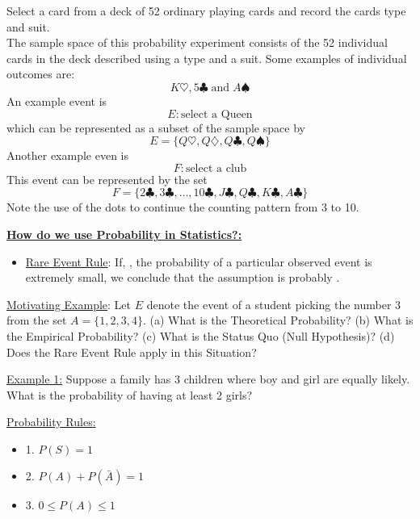 \documentclass[handout]{ximera}
\newcommand {\bi} {\begin{itemize}}
\newcommand {\ei} {\end{itemize}}
\begin{document}
	\begin{example}
	Select a card from a deck of 52 ordinary playing cards and record the cards type and suit.\\
	The sample space of this probability experiment consists of the 52 individual cards in the deck described using a type and a suit.  Some examples of individual outcomes are:
	\[
	K\heartsuit, 5 \clubsuit \; \mbox {and} \; A\spadesuit
	\]
	An example event is
	\[
	E: \mbox{select a Queen}
	\]
	which can be represented as a subset of the sample space by
	\[
	E = \{Q\heartsuit, Q\diamondsuit, Q\clubsuit, Q\spadesuit\}
	\]
	Another example even is
	\[
 F: \mbox{select a club}
\]
This event can be represented by the set
\[
F = \{2\clubsuit,3\clubsuit,\dots,10\clubsuit,J\clubsuit,Q\clubsuit,K\clubsuit, A\clubsuit\}
\]
Note the use of the dots to continue the counting pattern from 3 to 10.
	\end{example}
	

 \newpage

 \item \underline{\textbf{{\color{blue} How do we use Probability in Statistics?:}}}
   \bi
    \item \underline{Rare Event Rule}: If, \underline{\makebox[3in][c]{ }}, the probability of a particular observed event is extremely small, we conclude that the assumption is probably \underline{\makebox[2in][c]{ }}.
   \ei
  \item[] \underline{Motivating Example}: Let $E$ denote the event of a student picking the number 3 from the set $A = \{1,2,3,4\}$. (a) What is the Theoretical Probability? (b) What is the Empirical Probability? (c) What is the Status Quo (Null Hypothesis)? (d) Does the Rare Event Rule apply in this Situation?

\newpage


 \item[] \underline{Example 1:} Suppose a family has 3 children where boy and girl are equally likely. What is the probability of having at least 2 girls?


  \vspace{3.5in}


 \item \underline{Probability Rules:}

   \bi
    \item[1.] $P(S) = 1$
    \item[2.] $P(A) + P(\bar{A}) = 1$
    \item[3.] $0 \leq P(A) \leq 1$
   \ei
\end{document}
